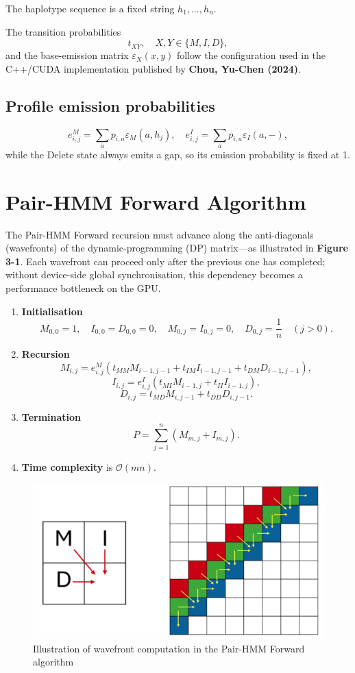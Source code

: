 \documentclass[PhD]{PHlab-thesis}
\begin{document}
The haplotype sequence is a fixed string $h_1, \dots, h_n$.

The transition probabilities
\[
t_{XY}, \quad X,Y \in \{M,I,D\},
\]
and the base-emission matrix $\varepsilon_X(x,y)$ follow the configuration used in the C++/CUDA implementation published by \textbf{Chou, Yu-Chen (2024)}.

\subsection{Profile emission probabilities}
\[
e_{i,j}^M = \sum_a p_{i,a} \varepsilon_M(a, h_j), \quad e_{i,j}^I = \sum_a p_{i,a} \varepsilon_I(a, -),
\]
while the Delete state always emits a gap, so its emission probability is fixed at 1.

\section{Pair-HMM Forward Algorithm}
The Pair-HMM Forward recursion must advance along the anti-diagonals (wavefronts) of the dynamic-programming (DP) matrix—as illustrated in \textbf{Figure 3-1}. Each wavefront can proceed only after the previous one has completed; without device-side global synchronisation, this dependency becomes a performance bottleneck on the GPU.

\begin{enumerate}
    \item \textbf{Initialisation}
    \[
    M_{0,0} = 1, \quad I_{0,0} = D_{0,0} = 0, \quad M_{0,j} = I_{0,j} = 0, \quad D_{0,j} = \frac{1}{n} \quad (j > 0).
    \]
    \item \textbf{Recursion}
    \[
    M_{i,j} = e_{i,j}^M (t_{MM} M_{i-1,j-1} + t_{IM} I_{i-1,j-1} + t_{DM} D_{i-1,j-1}),
    \]
    \[
    I_{i,j} = e_{i,j}^I (t_{MI} M_{i-1,j} + t_{II} I_{i-1,j}),
    \]
    \[
    D_{i,j} = t_{MD} M_{i,j-1} + t_{DD} D_{i,j-1}.
    \]
    \item \textbf{Termination}
    \[
    P = \sum_{j=1}^n (M_{m,j} + I_{m,j}).
    \]
    \item \textbf{Time complexity} is $\mathcal{O}(mn)$.
\end{enumerate}


\begin{figure}[htbp]
    \centering
    \includegraphics[width=0.7\linewidth]{Pair-HMM Forward 的計算沿反對角線 .png}
    \caption{Illustration of wavefront computation in the Pair-HMM Forward algorithm}
    \label{fig:pairhmm-wavefront}
\end{figure}
\end{document}
